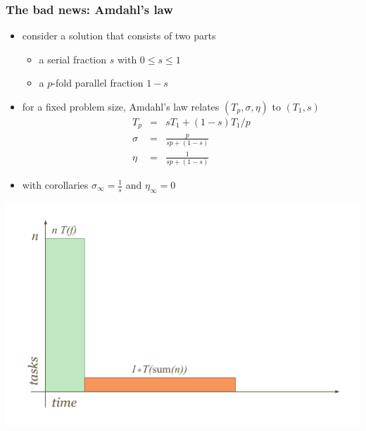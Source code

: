 %
\begin{frame}[fragile]
%
  \frametitle{The bad news: Amdahl's law}
%
  \begin{minipage}{.55\linewidth}
    \begin{itemize}
%
    \item consider a solution that consists of two parts
      \begin{itemize}
      \item a serial fraction $s$ with $0 \leq s \leq 1$
      \item a $p$-fold parallel fraction $1-s$
      \end{itemize}
%
    \item for a fixed problem size, Amdahl's law relates $(T_{p}, \sigma, \eta)$ to
      $(T_{1}, s)$
      \begin{eqnarray*}
        T_{p}  & = & s T_{1} + (1-s) T_{1} / p \\
        \sigma & = & \frac{p}{sp + (1-s)} \\
        \eta & = & \frac{1}{sp + (1-s)}
      \end{eqnarray*}
%
    \item with corollaries $\sigma_{\infty} = \frac{1}{s}$ and $\eta_{\infty} = 0$
    \end{itemize}
  \end{minipage}
  \hfill
  \begin{minipage}{.40\linewidth}
    \includegraphics[width=1.2\linewidth]{figures/reduction-parallel-work.pdf}
    \vspace{2em}


\end{minipage}
\end{frame}
